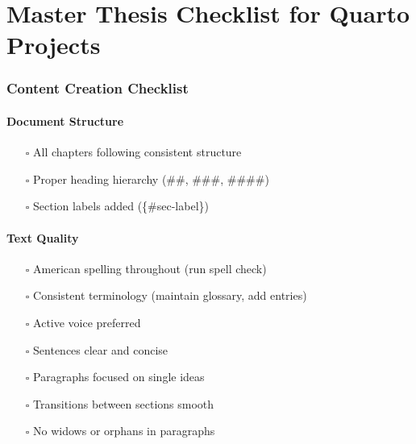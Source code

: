 \documentclass[
  11pt,
  letterpaper,
]{book}
\providecommand{\tightlist}{%
  \setlength{\itemsep}{0pt}\setlength{\parskip}{0pt}}
\begin{document}
\chapter*{Master Thesis Checklist for Quarto
Projects}\label{master-thesis-checklist-for-quarto-projects}


\subsection*{Content Creation
Checklist}\label{content-creation-checklist}

\subsubsection*{Document Structure}\label{document-structure}

\begin{itemize}
\tightlist
\item[$\square$]
  All chapters following consistent structure
\item[$\square$]
  Proper heading hierarchy (\#\#, \#\#\#, \#\#\#\#)
\item[$\square$]
  Section labels added (\{\#sec-label\})
\end{itemize}

\subsubsection*{Text Quality}\label{text-quality}

\begin{itemize}
\tightlist
\item[$\square$]
  American spelling throughout (run spell check)
\item[$\square$]
  Consistent terminology (maintain glossary, add entries)
\item[$\square$]
  Active voice preferred
\item[$\square$]
  Sentences clear and concise
\item[$\square$]
  Paragraphs focused on single ideas
\item[$\square$]
  Transitions between sections smooth
\item[$\square$]
  No widows or orphans in paragraphs
\end{itemize}
\end{document}
